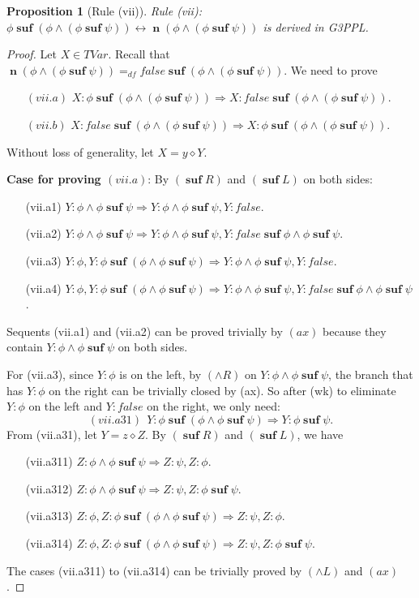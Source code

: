 \documentclass[manuscript,screen]{acmart}
\newtheorem{prop}{Proposition}[section]
\newcommand{\dddef}[0]{=_{df}}
\newcommand{\false}[0]{\mathit{false}}
\newcommand{\cat}[0]{\diamond}
\newcommand{\GiiiPPLcyc}[0]{\mbox{G3PPL}}
\DeclareMathOperator{\osuf}{\mathbf{suf}}
\newcommand{\TVar}[0]{\textit{TVar}}
\DeclareMathOperator{\nxt}{\mathbf{n}}
\begin{document}
\begin{prop}[Rule (vii)]
Rule (vii): 
$\phi\osuf(\phi\wedge (\phi\osuf \psi))\leftrightarrow \nxt (\phi\wedge (\phi\osuf \psi))$
is derived in \GiiiPPLcyc. 
\end{prop}

\begin{proof}
Let $X\in \TVar$. 
Recall that $\nxt(\phi\wedge(\phi\osuf\psi)) \dddef \false\osuf(\phi\wedge(\phi\osuf\psi))$. 
We need to prove
\begin{enumerate}
\item[$(vii.a)$] $X : \phi\osuf(\phi\wedge(\phi\osuf\psi))\Rightarrow X : \false\osuf(\phi\wedge(\phi\osuf\psi))$.
\item[$(vii.b)$] $X : \false\osuf(\phi\wedge(\phi\osuf\psi))\Rightarrow X : \phi\osuf(\phi\wedge(\phi\osuf\psi))$.
\end{enumerate}
Without loss of generality, let $X = y\cat Y$.

\textbf{Case for proving $(vii.a)$}: By $(\osuf R)$ and $(\osuf L)$ on both sides: 
\begin{enumerate}
\item[(vii.a1)] $Y : \phi\wedge \phi\osuf \psi\Rightarrow Y : \phi\wedge \phi\osuf \psi, Y : \false$. 
\item[(vii.a2)] $Y : \phi\wedge \phi\osuf \psi\Rightarrow Y : \phi\wedge \phi\osuf \psi, Y : \false\osuf\phi\wedge\phi\osuf \psi$. 
\item[(vii.a3)] $Y : \phi, Y : \phi\osuf (\phi\wedge \phi\osuf \psi)\Rightarrow Y : \phi\wedge \phi\osuf \psi, Y:\false$. 
\item[(vii.a4)] $Y : \phi, Y : \phi\osuf (\phi\wedge \phi\osuf \psi)\Rightarrow Y : \phi\wedge \phi\osuf \psi, Y:\false\osuf \phi\wedge\phi\osuf \psi$. 
\end{enumerate}
Sequents (vii.a1) and (vii.a2) can be proved trivially by $(ax)$ because they contain $Y : \phi\wedge \phi\osuf\psi$ on both sides. 

For (vii.a3), since $Y : \phi$ is on the left, by $(\wedge R)$ on $Y : \phi\wedge\phi\osuf\psi$, the branch that has $Y : \phi$ on the right can be trivially closed by (ax). 
So after (wk) to eliminate $Y : \phi$ on the left and $Y : \false$ on the right, we only need:
$$
(vii.a31)\ \ Y : \phi\osuf (\phi\wedge \phi\osuf \psi)\Rightarrow Y : \phi\osuf \psi. 
$$
From (vii.a31), let $Y = z\cat Z$. By $(\osuf R)$ and $(\osuf L)$, we have 
\begin{enumerate}
\item[(vii.a311)] $Z : \phi\wedge \phi\osuf \psi\Rightarrow Z : \psi, Z : \phi$. 
\item[(vii.a312)] $Z : \phi\wedge \phi\osuf \psi\Rightarrow Z : \psi, Z : \phi\osuf\psi$. 
\item[(vii.a313)] $Z : \phi, Z : \phi\osuf(\phi\wedge \phi\osuf\psi)\Rightarrow Z : \psi, Z : \phi$. 
\item[(vii.a314)] $Z : \phi, Z : \phi\osuf(\phi\wedge \phi\osuf\psi)\Rightarrow Z : \psi, Z : \phi\osuf\psi$. 
\end{enumerate}
The cases (vii.a311) to (vii.a314) can be trivially proved by $(\wedge L)$ and $(ax)$. 


\end{proof}
\end{document}
